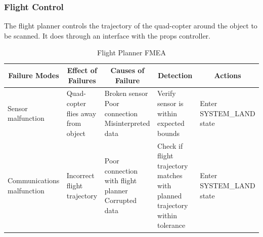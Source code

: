 \documentclass[10pt,letterpaper]{article}
\newcommand{\fmeaheader}{\multicolumn{1}{c}{\textbf{Failure Modes}} & \multicolumn{1}{c}{\textbf{Effect of Failures}} & \multicolumn{1}{c}{\textbf{Causes of Failure}} & \multicolumn{1}{c}{\textbf{Detection}} & \multicolumn{1}{c}{\textbf{Actions}}}
\begin{document}
\subsubsection{Flight Control}
The flight planner controls the trajectory of the quad-copter around the object to be scanned. It does through an interface with the props controller.
\begin{table}[H]
\footnotesize  
	\begin{adjustwidth}{-1.8in}{-1.8in}  
      \begin{center}
          \begin{tabular}{|p{3cm}p{3cm}p{3cm}p{3cm}p{4.5cm}|}
              \fmeaheader \\ \hline
              Sensor malfunction & 
              Quad-copter flies away from object & 
              \parbox[t]{3cm}{Broken sensor \\ Poor connection \\ Misinterpreted data} & 
              Verify sensor is within expected bounds &
              Enter SYSTEM\_LAND state \\ \hline
              
              Communications malfunction & 
              Incorrect flight trajectory & 
              \parbox[t]{3cm}{Poor connection with flight planner \\ Corrupted data} & 
              Check if flight trajectory matches with planned trajectory within tolerance &
              Enter SYSTEM\_LAND state \\ \hline
          \end{tabular}
      \end{center}
      \caption[Flight Planner FMEA]{Flight Planner FMEA}
    \end{adjustwidth}
\end{table}
\end{document}
